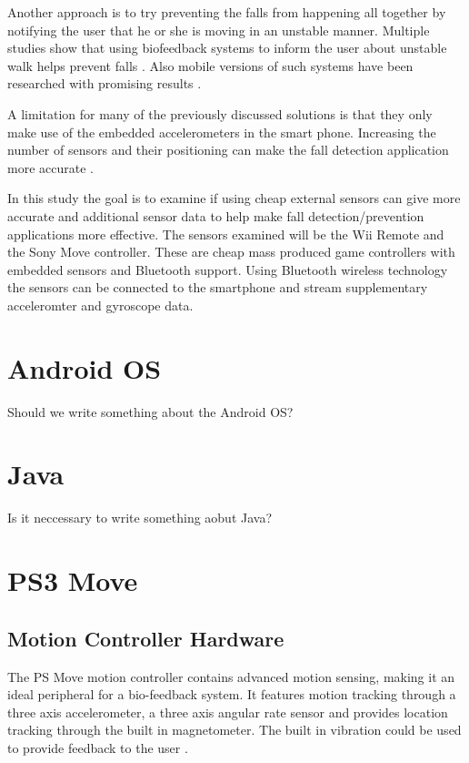 \documentclass[11pt,twoside,a4paper]{report}
\begin{document}
Another approach is to try preventing the falls from happening all together by notifying the user that he or she is moving in an unstable manner. Multiple studies show that using biofeedback systems to inform the user about unstable walk helps prevent falls \cite{multiModualBiofeedback, vibrotactileBiofeedback, vibrotactileTiltFeedback}. %
Also mobile versions of such systems have been researched with promising results \cite{fallPrevention}.

A limitation for many of the previously discussed solutions is that they only make use of the embedded accelerometers in the smart phone. Increasing the number of sensors and their positioning can make the fall detection application more accurate \cite{fallDetectionWithExtraSensors}.

In this study the goal is to examine if using cheap external sensors can give more accurate and additional sensor data to help make fall detection/prevention applications more effective. The sensors examined will be the Wii Remote and the Sony Move controller. These are cheap mass produced game controllers with embedded sensors and Bluetooth support. Using Bluetooth wireless technology the sensors can be connected to the smartphone and stream supplementary acceleromter and gyroscope data.


\section{Android OS}
Should we write something about the Android OS?

\section{Java}
Is it neccessary to write something aobut Java?

\section{PS3 Move}

\subsection{Motion Controller Hardware}
The PS Move motion controller contains advanced motion sensing, making it an ideal peripheral for a bio-feedback system. It features motion tracking through a three axis accelerometer, a three axis angular rate sensor and provides location tracking through the built in magnetometer. The built in vibration could be used to provide feedback to the user \cite{psMoveTech}.
\end{document}
